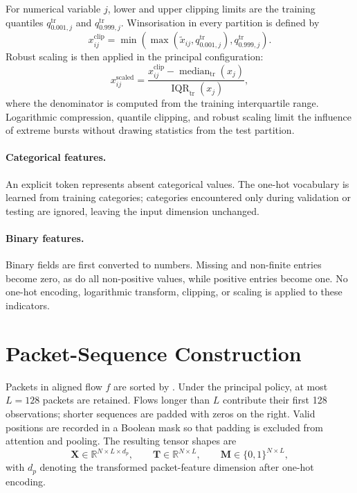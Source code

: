 \documentclass[11pt,fleqn]{report}
\begin{document}
For numerical variable $j$, lower and upper clipping limits are the training quantiles $q_{0.001,j}^{\mathrm{tr}}$ and $q_{0.999,j}^{\mathrm{tr}}$. Winsorisation in every partition is defined by
\begin{equation}
    x_{ij}^{\mathrm{clip}}
    = \min\!\left(
        \max\!\left(\widetilde{x}_{ij},q_{0.001,j}^{\mathrm{tr}}\right),
        q_{0.999,j}^{\mathrm{tr}}
      \right).
    \label{eq:quantile_clipping}
\end{equation}
Robust scaling is then applied in the principal configuration:
\begin{equation}
    x_{ij}^{\mathrm{scaled}}
    = \frac{x_{ij}^{\mathrm{clip}}-
             \operatorname{median}_{\mathrm{tr}}(x_j)}
            {\operatorname{IQR}_{\mathrm{tr}}(x_j)},
    \label{eq:robust_scaling}
\end{equation}
where the denominator is computed from the training interquartile range. Logarithmic compression, quantile clipping, and robust scaling limit the influence of extreme bursts without drawing statistics from the test partition.

\paragraph{Categorical features.}
An explicit  token represents absent categorical values. The one-hot vocabulary is learned from training categories; categories encountered only during validation or testing are ignored, leaving the input dimension unchanged.

\paragraph{Binary features.}
Binary fields are first converted to numbers. Missing and non-finite entries become zero, as do all non-positive values, while positive entries become one. No one-hot encoding, logarithmic transform, clipping, or scaling is applied to these indicators.

\section{Packet-Sequence Construction}
\label{subsec:sequence_construction}

Packets in aligned flow $f$ are sorted by . Under the principal  policy, at most $L=128$ packets are retained. Flows longer than $L$ contribute their first 128 observations; shorter sequences are padded with zeros on the right. Valid positions are recorded in a Boolean mask so that padding is excluded from attention and pooling. The resulting tensor shapes are
\begin{equation}
    \mathbf{X}\in\mathbb{R}^{N\times L\times d_p},\qquad
    \mathbf{T}\in\mathbb{R}^{N\times L},\qquad
    \mathbf{M}\in\{0,1\}^{N\times L},
    \label{eq:stage1_tensor_shapes}
\end{equation}
with $d_p$ denoting the transformed packet-feature dimension after one-hot encoding.
\end{document}
